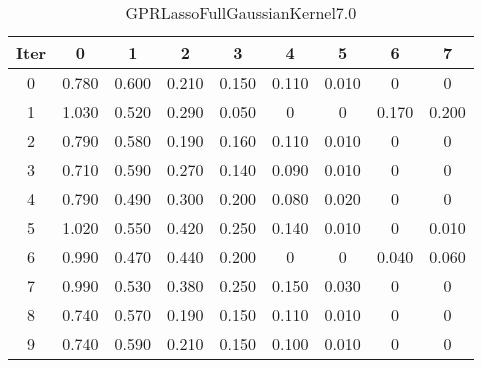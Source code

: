 \begin{table}
	\begin{center}
		\begin{tabular}{|c|c|c|c|c|c|c|c|c|}
			\hline
			Iter & 0 & 1 & 2 & 3 & 4 & 5 & 6 & 7 \\
			\hline
			0 & 0.780 & 0.600 & 0.210 & 0.150 & 0.110 & 0.010 & 0 & 0 \\
			\hline
			1 & 1.030 & 0.520 & 0.290 & 0.050 & 0 & 0 & 0.170 & 0.200 \\
			\hline
			2 & 0.790 & 0.580 & 0.190 & 0.160 & 0.110 & 0.010 & 0 & 0 \\
			\hline
			3 & 0.710 & 0.590 & 0.270 & 0.140 & 0.090 & 0.010 & 0 & 0 \\
			\hline
			4 & 0.790 & 0.490 & 0.300 & 0.200 & 0.080 & 0.020 & 0 & 0 \\
			\hline
			5 & 1.020 & 0.550 & 0.420 & 0.250 & 0.140 & 0.010 & 0 & 0.010 \\
			\hline
			6 & 0.990 & 0.470 & 0.440 & 0.200 & 0 & 0 & 0.040 & 0.060 \\
			\hline
			7 & 0.990 & 0.530 & 0.380 & 0.250 & 0.150 & 0.030 & 0 & 0 \\
			\hline
			8 & 0.740 & 0.570 & 0.190 & 0.150 & 0.110 & 0.010 & 0 & 0 \\
			\hline
			9 & 0.740 & 0.590 & 0.210 & 0.150 & 0.100 & 0.010 & 0 & 0 \\
			\hline
		\end{tabular}
	\end{center}
	\caption{GPRLassoFullGaussianKernel7.0}
\end{table}